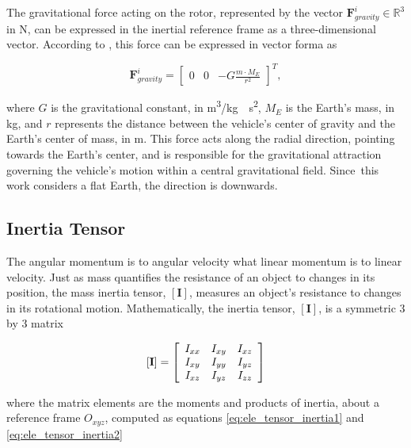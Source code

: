The gravitational force acting on the rotor, represented by the vector \(\mathbf{F}_{gravity}^i \in \mathbb{R}^3\) in \unit{N}, can be expressed in the inertial reference frame as a three-dimensional vector. According to \cite{curtis_orbital_2008}, this force can be expressed in vector forma as 

\begin{equation}
    \mathbf{F}_{gravity}^i = 
    \begin{bmatrix}
        0 & 0 & -G \frac{m \cdot M_E}{r^2}
    \end{bmatrix}^T,
\end{equation}  

\noindent where $G$ is the gravitational constant, in \unit{m^3/kg \cdot s^2}, $M_E$ is the Earth's mass, in \unit{kg}, and $r$ represents the distance between the vehicle's center of gravity and the Earth's center of mass, in \unit{m}. This force acts along the radial direction, pointing towards the 
Earth's center, and is responsible for the gravitational attraction governing the vehicle's motion within a central gravitational field. Since\ this work considers a flat Earth, the direction is downwards.


\subsection{Inertia Tensor}

The angular momentum is to angular velocity what linear momentum is to linear velocity. Just as mass quantifies the resistance of an object to changes in its position, the mass inertia tensor, $\left[\mathbf{I}\right]$, measures an object's resistance to changes in its rotational motion. Mathematically, the inertia tensor, $\left[\mathbf{I}\right]$, is a symmetric 3 by 3 matrix 

\begin{equation}
    \left[\mathbf{I}\right]=\left[\begin{array}{c c c}{{I_{x x}}}&{{I_{x y}}}&{{I_{x z}}}\\ {{I_{x y}}}&{{I_{y y}}}&{{I_{y z}}}\\ {{I_{x z}}}&{{I_{y z}}}&{{I_{z z}}}\end{array}\right]
\end{equation}

\noindent where the matrix elements are the moments and products of inertia, about a reference frame $O_{xyz}$, computed as equations \ref{eq:ele_tensor_inertia1} and \ref{eq:ele_tensor_inertia2}

